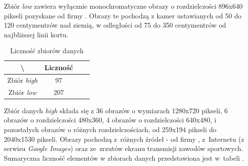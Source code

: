 Zbiór \textit{low} zawiera wyłącznie monochromatyczne obrazy o rozdzielczości 896x640 pikseli pozyskane od firmy \blue{}. Obrazy te pochodzą z kamer ustawianych od 50 do 120 centymentrów nad ziemią, w odległości od 75 do 350 centymentrów od najbliższej linii kortu.

\begin{table}[!h]
	\centering
	\caption{Liczność zbiorów danych}
	\vspace{6pt}
	{\footnotesize
		\begin{tabular}{|c|c|c|c|}
			\hline \textbackslash & Liczność \\
      \hline Zbiór \textit{high} & 97 \\
      \hline Zbiór \textit{low} & 207 \\
      \hline
    \end{tabular}
    \label{Tab:licznosc}
	}
	\vspace{0pt}
\end{table}

Zbiór danych \textit{high} składa się z 36 obrazów o wymiarach 1280x720 pikseli, 6 obrazów o rozdzielczości 480x360, 4 obrazów o rozdzielczości 640x480, i pozostałych obrazów o różnych rozdzielczościach, od 259x194 pikseli do 2040x1530 pikseli. Obrazy pochodzą z~różnych źródeł - od firmy \blue{}, z~Internetu (z serwisu \textit{Google Images}) oraz ze~zrzutów ekranu transmisji zawodów sportowych. Sumaryczna liczność elementów w zbiorach danych przedstawiona jest w~tabeli .
